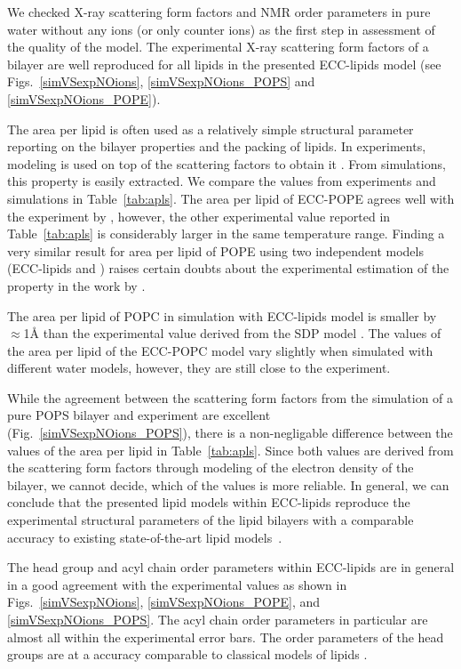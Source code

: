  
We checked X-ray scattering form factors and NMR order parameters 
in pure water without any ions (or only counter ions)
as the first step in assessment of the quality of the model. 
The experimental X-ray scattering form factors 
of a bilayer are well reproduced for all lipids in the presented ECC-lipids model 
(see Figs.~\ref{simVSexpNOions}, \ref{simVSexpNOions_POPS} and \ref{simVSexpNOions_POPE}). 

The area per lipid is often used as a relatively simple structural parameter reporting on the bilayer properties and the packing of lipids. 
In experiments, modeling is used on top of the scattering factors to obtain it \citep{SDP-CHARMM36_comparison_paper_Samuli-knows}. 
From simulations, this property is easily extracted. 
We compare the values from experiments and simulations in Table~\ref{tab:apls}. 
The area per lipid of ECC-POPE agrees well with the experiment by \citet{parsegian89}, 
however, the other experimental value reported in Table~\ref{tab:apls} is considerably larger in the same temperature range. 
Finding a very similar result for area per lipid of POPE using two independent models (ECC-lipids and \citep{parsegian89})
raises certain doubts about the experimental estimation of the property in the work by \citet{rappolt03}. 

The area per lipid of POPC in simulation with ECC-lipids model is smaller by $\approx$1Å 
than the experimental value derived from the SDP model \citep{SDP-CHARMM36_comparison_paper_Samuli-knows}. 
The values of the area per lipid of the ECC-POPC model vary slightly 
when simulated with different water models, however,
they are still close to the experiment. 

While the agreement between the scattering form factors 
from the simulation of a pure POPS bilayer and experiment 
are excellent (Fig.~\ref{simVSexpNOions_POPS}),
there is a non-negligable difference between the values of the area per lipid in Table~\ref{tab:apls}. 
Since both values are derived from the scattering form factors through modeling of the electron density of the bilayer,
we cannot decide, which of the values is more reliable. 
In general, we can conclude that the presented lipid models within ECC-lipids 
reproduce the experimental structural parameters of the lipid bilayers 
with a comparable accuracy to existing state-of-the-art lipid models~\citep{ollila16}. 
 
The head group and acyl chain order parameters within ECC-lipids
are in general in a good agreement with the experimental values 
as shown in Figs.~\ref{simVSexpNOions}, \ref{simVSexpNOions_POPE},  and \ref{simVSexpNOions_POPS}. 
The acyl chain order parameters in particular are almost all within the experimental error bars.
The order parameters of the head groups are at a accuracy comparable to classical models of lipids \citep{botan15, catte16}. 

